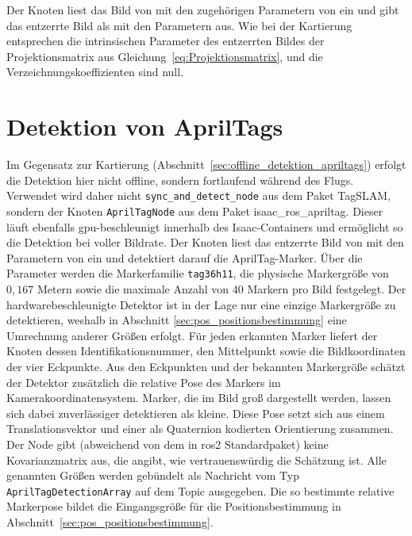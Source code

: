 Der Knoten liest das Bild von  mit den zugehörigen Parametern von  ein und gibt das 
entzerrte Bild als  mit den Parametern  aus.
Wie bei der Kartierung entsprechen die intrinsischen Parameter des entzerrten Bildes der Projektionsmatrix aus 
Gleichung~\eqref{eq:Projektionsmatrix}, und die Verzeichnungskoeffizienten sind null.



\section{Detektion von AprilTags}
\label{sec:pos_detektion_apriltags}
Im Gegensatz zur Kartierung (Abschnitt~\ref{sec:offline_detektion_apriltags}) erfolgt die Detektion hier nicht offline, sondern fortlaufend während des Flugs.
Verwendet wird daher nicht \texttt{sync\_and\_detect\_node} aus dem Paket TagSLAM, sondern der Knoten \texttt{AprilTagNode} aus dem Paket isaac\_ros\_apriltag.
Dieser läuft ebenfalls \gls{gpu}-beschleunigt innerhalb des Isaac-Containers und ermöglicht so die Detektion bei voller Bildrate.
Der Knoten liest das entzerrte Bild von  mit den Parametern von  ein und detektiert
darauf die AprilTag-Marker.
Über die Parameter werden die Markerfamilie \texttt{tag36h11}, die physische Markergröße von $0{,}167$ Metern sowie die maximale Anzahl von $40$ Markern
pro Bild festgelegt. Der hardwarebeschleunigte Detektor ist in der Lage nur eine einzige Markergröße zu detektieren, weshalb in Abschnitt
\ref{sec:pos_positionsbestimmung} eine Umrechnung anderer Größen erfolgt.
Für jeden erkannten Marker liefert der Knoten dessen Identifikationsnummer, den Mittelpunkt sowie die Bildkoordinaten der vier Eckpunkte.
Aus den Eckpunkten und der bekannten Markergröße schätzt der Detektor zusätzlich die relative Pose des Markers im Kamerakoordinatensystem.
Marker, die im Bild groß dargestellt werden, lassen sich dabei zuverlässiger detektieren als kleine.
Diese Pose setzt sich aus einem Translationsvektor und einer als Quaternion kodierten
Orientierung zusammen. Der Node gibt (abweichend von dem in \gls{ros2} Standardpaket) keine Kovarianzmatrix aus, die angibt, wie vertrauenswürdig die Schätzung ist.
Alle genannten Größen werden gebündelt als Nachricht vom Typ \texttt{AprilTagDetectionArray} auf dem Topic  ausgegeben.
Die so bestimmte relative Markerpose bildet die Eingangsgröße für die Positionsbestimmung in Abschnitt~\ref{sec:pos_positionsbestimmung}.




